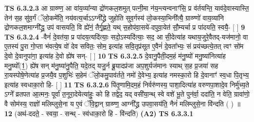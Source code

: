 \documentclass[17pt]{extarticle}
\begin{document}
                  \newline
                                \textbf{ TS 6.3.2.3} \newline
                  आ ग्राव्ण्ण॒ आ वा॑य॒व्या᳚न्या द्रो॑णकल॒शमुत् पत्नी॒मा न॑य॒न्त्यन्वनाꣳ॑सि॒ प्र व॑र्तयन्ति॒ याव॑दे॒वास्यास्ति॒ तेन॑ स॒ह सु॑व॒र्गं ॅलो॒कमे॑ति॒ नय॑वत्य॒र्चाऽऽग्नी᳚द्ध्रे जुहोति सुव॒र्गस्य॑ लो॒कस्या॒भिनी᳚त्यै॒ ग्राव्ण्णो॑ वाय॒व्या॑नि द्रोणकल॒शमाग्नी᳚द्ध्र॒ उप॑ वासयति॒ वि ह्ये॑नं॒ तैर्गृ॒ह्णते॒ यथ् स॒होप॑वा॒सये॑-दपुवा॒येत॑ सौ॒म्यर्चा प्र पा॑दयति॒ स्वयै॒- [  ] \textbf{  9} \newline
                  \newline
                                \textbf{ TS 6.3.2.4} \newline
                  -वैनं॑ दे॒वत॑या॒ प्र पा॑दय॒त्यदि॑त्याः॒ सदो॒ऽस्यदि॑त्याः॒ सद॒ आ सी॒देत्या॑ह यथाय॒जुरे॒वैतद्-यज॑मानो॒ वा ए॒तस्य॑ पु॒रा गो॒प्ता भ॑वत्ये॒ष वो॑ देव सवितः॒ सोम॒ इत्या॑ह सवि॒तृप्र॑सूत ए॒वैनं॑ दे॒वता᳚भ्यः॒ सं प्रय॑च्छत्ये॒तत् त्वꣳ सो॑म दे॒वो दे॒वानुपा॑गा॒ इत्या॑ह दे॒वो ह्ये॑ष सन्- [  ] \textbf{  10} \newline
                  \newline
                                \textbf{ TS 6.3.2.5} \newline
                  दे॒वानु॒पैती॒दम॒हं म॑नु॒ष्यो॑ मनु॒ष्या॑नित्या॑ह मनु॒ष्यो᳚(1॒) ह्ये॑ष सन् म॑नु॒ष्या॑नु॒पैति॒ यदे॒तद् यजु॒र्न ब्रू॒यादप्र॑जा अप॒शुर्यज॑मानः स्याथ् स॒ह प्र॒जया॑ सह रा॒यस्पोषे॒णेत्या॑ह प्र॒जयै॒व प॒शुभिः॑ स॒हेमं ॅलो॒कमु॒पाव॑र्तते॒ नमो॑ दे॒वेभ्य॒ इत्या॑ह नमस्का॒रो हि दे॒वानाꣳ॑ स्व॒धा पि॒तृभ्य॒ इत्या॑ह स्वधाका॒रो हि- [  ] \textbf{  11} \newline
                  \newline
                                \textbf{ TS 6.3.2.6} \newline
                  पि॑तृ॒णामि॒दम॒हं निर्वरु॑णस्य॒ पाशा॒दित्या॑ह वरुणपा॒शादे॒व निर्मु॑च्य॒ते ऽग्ने᳚ व्रतपत आ॒त्मनः॒ पूर्वा॑ त॒नूरा॒देयेत्या॑हुः॒ को हि तद्वेद॒ यद् वसी॑या॒न्थ् स्वे वशे॑ भू॒ते पुन॑र्वा॒ ददा॑ति॒ न वेति॒ ग्रावा॑णो॒ वै सोम॑स्य॒ राज्ञो॑ मलिम्लुसे॒ना य ए॒वं ॅवि॒द्वान् ग्राव्ण्ण॒॒ आग्नी᳚द्ध्र उपवा॒सय॑ति॒ नैनं॑ मलिम्लुसे॒ना वि॑न्दति ( ) ॥ \textbf{  12 } \newline
                  \newline
                      (अथ॑-ददते॒ - स्वया॒ - सन्थ् - स्व॑धाका॒रो हि - वि॑न्दति)  \textbf{(A2)} \newline \newline
                                        \textbf{ TS 6.3.3.1} \newline
\end{document}
